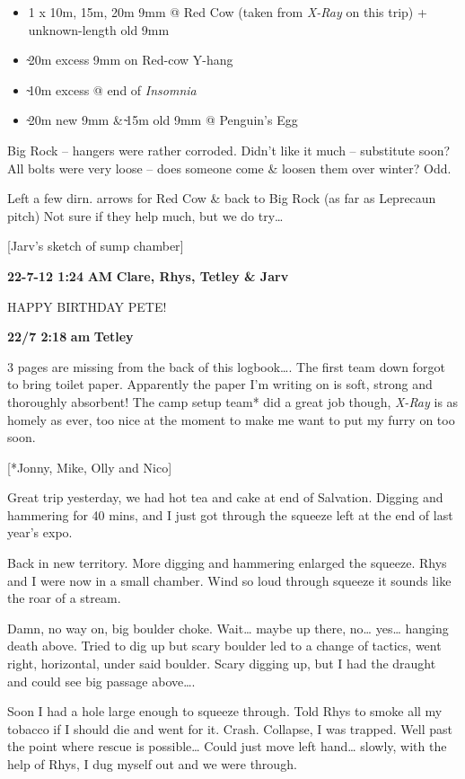 \begin{itemize}
\tightlist
\item
  1 x 10m, 15m, 20m 9mm @ Red Cow (taken from \emph{X-Ray} on this trip)
  + unknown-length old 9mm
\item
  ̴20m excess 9mm on Red-cow Y-hang
\item
  ̴10m excess @ end of \emph{Insomnia}
\item
  ̴20m new 9mm \& ̴15m old 9mm @ Penguin's Egg
\end{itemize}

Big Rock -- hangers were rather corroded. Didn't like it much --
substitute soon? All bolts were very loose -- does someone come \&
loosen them over winter? Odd.

Left a few dirn. arrows for Red Cow \& back to Big Rock (as far as
Leprecaun pitch) Not sure if they help much, but we do try\ldots{}

{[}Jarv's sketch of sump chamber{]}

\textbf{22-7-12 1:24} \textbf{AM} \textbf{Clare, Rhys, Tetley \& Jarv}

HAPPY BIRTHDAY PETE!

\textbf{22/7 2:18} \textbf{am} \textbf{Tetley}

3 pages are missing from the back of this logbook\ldots{}. The first
team down forgot to bring toilet paper. Apparently the paper I'm writing
on is soft, strong and thoroughly absorbent! The camp setup team* did a
great job though, \emph{X-Ray} is as homely as ever, too nice at the
moment to make me want to put my furry on too soon.

{[}*Jonny, Mike, Olly and Nico{]}

Great trip yesterday, we had hot tea and cake at end of Salvation.
Digging and hammering for 40 mins, and I just got through the squeeze
left at the end of last year's expo.

Back in new territory. More digging and hammering enlarged the squeeze.
Rhys and I were now in a small chamber. Wind so loud through squeeze it
sounds like the roar of a stream.

Damn, no way on, big boulder choke. Wait\ldots{} maybe up there,
no\ldots{} yes\ldots{} hanging death above. Tried to dig up but scary
boulder led to a change of tactics, went right, horizontal, under said
boulder. Scary digging up, but I had the draught and could see big
passage above\ldots{}.

Soon I had a hole large enough to squeeze through. Told Rhys to smoke
all my tobacco if I should die and went for it. Crash. Collapse, I was
trapped. Well past the point where rescue is possible\ldots{} Could just
move left hand\ldots{} slowly, with the help of Rhys, I dug myself out
and we were through.

